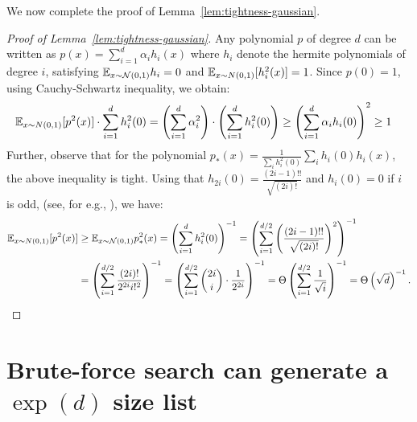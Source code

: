 

We now complete the proof of Lemma~\ref{lem:tightness-gaussian}.

\begin{proof} [Proof of Lemma~\ref{lem:tightness-gaussian}]
Any polynomial $p$ of degree $d$ can be written as $p(x) = \sum_{i = 1}^d \alpha_i h_i(x)$ where $h_i$ denote the hermite polynomials of degree $i$, satisfying $\mathbb{E}_{x \sim \mathcal N(0,1)} h_i = 0$ and $\mathbb{E}_{x \sim N(0,1)} [h^2_i(x)] = 1$. Since $p(0) =  1$, using Cauchy-Schwartz inequality, we obtain:
\begin{align*}
\mathbb{E}_{x \sim N(0,1)} [p^2(x)] \cdot \sum_{i=1}^d h_i^2(0) &= \left( \sum_{i=1}^d \alpha_i^2\right) \cdot \left(\sum_{i=1}^d h_i^2(0)\right) \geq \left(\sum_{i=1}^d \alpha_i h_i(0) \right)^2 \geq 1 
\end{align*}
Further, observe that for the polynomial $p_{*}(x)=  \frac{1}{\sum_i h_i^2(0)} \sum_{i} h_i(0) h_i(x)$, the above inequality is tight.  
Using that $h_{2i}(0) = \frac{(2i-1)!!}{\sqrt{(2i)!}}$ and $h_i(0) = 0$ if $i$ is odd, (see, for e.g., \cite{HermiteNum}), we have:
\begin{align*}
    \mathbb{E}_{x \sim N(0,1)} [p^2(x)] &\geq \mathbb{E}_{x \sim \mathcal N(0,1)} p_*^2(x)=\left(\sum_{i=1}^d h_i^2(0)\right)^{-1} = \left(\sum_{i=1}^{d/2} \left(\frac{(2i-1)!!}{\sqrt{(2i)!}}\right)^2\right)^{-1}\\
    & = \left(\sum_{i=1}^{d/2} \frac{(2i)!}{2^{2i} i!^2} \right)^{-1} = \left( \sum_{i=1}^{d/2} \binom{2i}{i} \cdot \frac{1}{2^{2i}} \right)^{-1} = \Theta\left(\sum_{i=1}^{d/2} \frac{1}{\sqrt{i}}\right)^{-1} = \Theta\left(\sqrt{d} \right)^{-1}.
\end{align*}  
\end{proof}

\section{Brute-force search can generate a $\exp(d)$ size list} 



